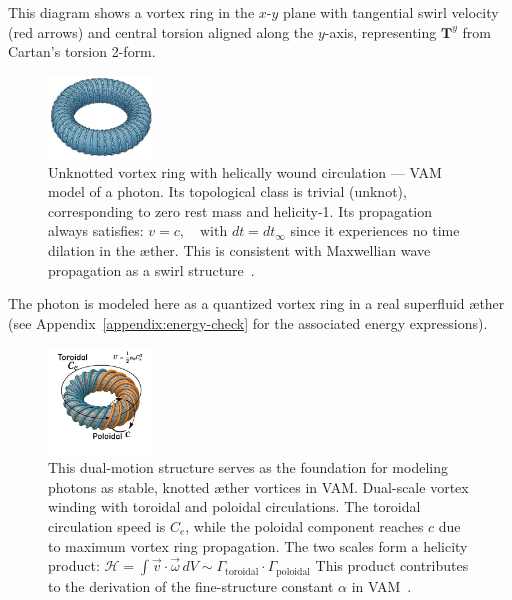 This diagram shows a vortex ring in the $x$-$y$ plane with tangential swirl velocity (red arrows) and central torsion aligned along the $y$-axis,
representing $\mathbf{T}^y$ from Cartan's torsion 2-form.

\begin{figure}[H]
    \centering
    \includegraphics[width=0.25\textwidth]{figures/Un-Knot}
    \caption{Unknotted vortex ring with helically wound circulation — VAM model of a photon. Its topological class is trivial (unknot), corresponding to zero rest mass and helicity-1. Its propagation always satisfies:
        \( v = c, \quad \text{with } dt = dt_{\infty} \)
        since it experiences no time dilation in the æther. This is consistent with Maxwellian wave propagation as a swirl structure~\cite{maxwell1875}.}
    \label{fig:un-knot}
\end{figure}


The photon is modeled here as a quantized vortex ring in a real superfluid æther (see Appendix~\ref{appendix:energy-check} for the associated energy expressions).

\begin{figure}[H]
    \centering
    \includegraphics[width=0.25\textwidth]{figures/vortex-fine-structure}
    \caption{
        This dual-motion structure serves as the foundation for modeling photons as stable, knotted æther vortices in VAM.
        Dual-scale vortex winding with toroidal and poloidal circulations. The toroidal circulation speed is $C_e$, while the poloidal component reaches $c$ due to maximum vortex ring propagation. The two scales form a helicity product:
        \(
            \mathcal{H} = \int \vec{v} \cdot \vec{\omega} \, dV \sim \Gamma_{\text{toroidal}} \cdot \Gamma_{\text{poloidal}}
        \)
        This product contributes to the derivation of the fine-structure constant $\alpha$ in VAM~\cite{VAM-1}.
    }
    \label{fig:vortex-3d}
\end{figure}




